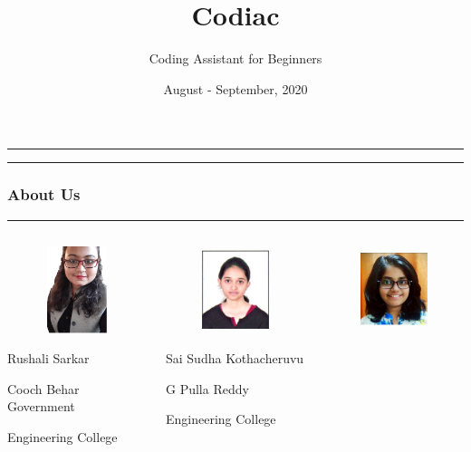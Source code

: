 \documentclass[14pt]{beamer}
\title[Codiac]{Codiac}
\author[]{Coding Assistant for Beginners}
\date []{August - September, 2020}
\begin{document}
\begin{frame}
    \noindent
    {\color{pink} \rule{\linewidth}{0.7mm} }
    \titlepage
    \noindent
    {\color{pink} \rule{\linewidth}{0.7mm} }
\end{frame}

\begin{frame}
    \frametitle{About Us}
    \noindent
    {\color{pink} \rule {\linewidth}{0.7mm}}
    \begin{columns}
        \begin{column}{0.2\textwidth}
            \begin{figure}[htbp]
            \centerline{\includegraphics[width=1in, height=1in]{./Codiac/logos/rushali.jpeg}}
            \end{figure}
               \begin{spacing}{0.5}
          \centerline {\tiny Rushali Sarkar} 
           \centerline {\tiny Cooch Behar Government} 
           \centerline {\tiny Engineering College} 
               \end{spacing}
        \end{column}
        \begin{column}{0.2\textwidth}
            \begin{figure}[htbp]
            \centerline{\includegraphics[width=1in, height=1in]{./Codiac/logos/sudha.jpeg}}
            \end{figure}
             \begin{spacing}{0.5}
                \centerline {\tiny Sai Sudha Kothacheruvu}
                 \centerline {\tiny G Pulla Reddy}
                  \centerline {\tiny Engineering College}
                  \end{spacing}
        \end{column}
        \begin{column}{0.2\textwidth}
            \begin{figure}[htbp]
            \centerline{\includegraphics[width=1in, height=1in]{./Codiac/logos/nimisha.jpg}}

\end{figure}
\end{column}
\end{columns}
\end{frame}
\end{document}
